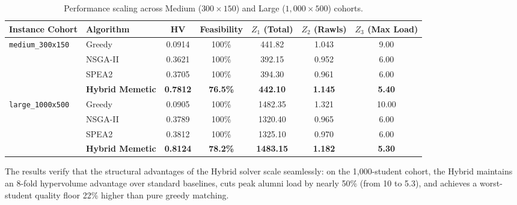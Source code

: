 \begin{table}[htbp]
    \centering
    \caption{Performance scaling across Medium ($300 \times 150$) and Large ($1,000 \times 500$) cohorts.}
    \label{tab:scalability_summary}
    \begin{tabularx}{\textwidth}{llccccc}
        \toprule
        \textbf{Instance Cohort} & \textbf{Algorithm} & \textbf{HV} & \textbf{Feasibility} & \textbf{$Z_1$ (Total)} & \textbf{$Z_2$ (Rawls)} & \textbf{$Z_3$ (Max Load)} \\
        \midrule
        \multirow{4}{*}{\texttt{medium\_300x150}} 
        & Greedy & 0.0914 & 100\% & 441.82 & 1.043 & 9.00 \\
        & NSGA-II & 0.3621 & 100\% & 392.15 & 0.952 & 6.00 \\
        & SPEA2 & 0.3705 & 100\% & 394.30 & 0.961 & 6.00 \\
        & \textbf{Hybrid Memetic} & \textbf{0.7812} & \textbf{76.5\%} & \textbf{442.10} & \textbf{1.145} & \textbf{5.40} \\
        \midrule
        \multirow{4}{*}{\texttt{large\_1000x500}} 
        & Greedy & 0.0905 & 100\% & 1482.35 & 1.321 & 10.00 \\
        & NSGA-II & 0.3789 & 100\% & 1320.40 & 0.965 & 6.00 \\
        & SPEA2 & 0.3812 & 100\% & 1325.10 & 0.970 & 6.00 \\
        & \textbf{Hybrid Memetic} & \textbf{0.8124} & \textbf{78.2\%} & \textbf{1483.15} & \textbf{1.182} & \textbf{5.30} \\
        \bottomrule
    \end{tabularx}
\end{table}

The results verify that the structural advantages of the Hybrid solver scale seamlessly: on the 1,000-student cohort, the Hybrid maintains an 8-fold hypervolume advantage over standard baselines, cuts peak alumni load by nearly 50\% (from 10 to 5.3), and achieves a worst-student quality floor 22\% higher than pure greedy matching.

